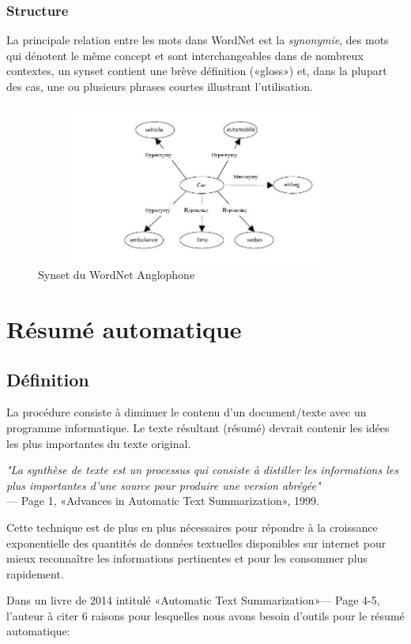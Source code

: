         \subsubsection{Structure}
        La principale relation entre les mots dans WordNet est la \emph{synonymie}, des mots qui dénotent le même concept et sont interchangeables dans de nombreux contextes, un synset contient une brève définition («gloss») et, dans la plupart des cas, une ou plusieurs phrases courtes illustrant l'utilisation.
        \begin{figure}[H]
            \centering
                \includegraphics[height=150pt,width=300pt]{img/chapter2/wordnet.jpg}
            \caption{Synset du WordNet Anglophone}
        \end{figure}

\section{Résumé automatique}
    \subsection{Définition}
    La procédure consiste à diminuer le contenu d'un document/texte avec un programme informatique. Le texte résultant (résumé) devrait contenir les idées les plus importantes du texte original.

    \emph{"La synthèse de texte est un processus qui consiste à distiller les informations les plus importantes d'une source pour produire une version abrégée"}\\
    — Page 1, «Advances in Automatic Text Summarization»\cite{aats}, 1999.

    Cette technique est de plus en plus nécessaires pour répondre à la croissance exponentielle des quantités  de données textuelles disponibles sur internet pour mieux reconnaître les informations pertinentes et pour les consommer plus rapidement.

    Dans un livre de 2014 intitulé «Automatic Text Summarization»\cite{atsjmtm}— Page 4-5, l'auteur à citer 6 raisons pour lesquelles nous avons besoin d'outils pour le résumé automatique:

